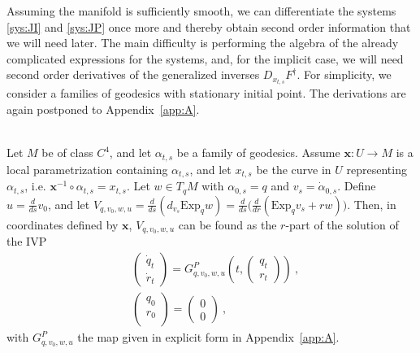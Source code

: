 \documentclass[final]{svjour3}
\newcommand{\df}[2]{\tfrac{d}{d#2} #1}
\newcommand{\Exp}{\mathrm{Exp}}
\newcommand{\param}[1]{\mathbf{#1}}
\begin{document}
Assuming the manifold is sufficiently smooth, we can differentiate the systems 
\eqref{sys:JI} and \eqref{sys:JP} once more and thereby obtain second order
information that we will need later. The main difficulty is
performing the algebra of the already complicated expressions for the systems,
and, for the implicit case, we will need second
order derivatives of the generalized inverses $D_{x_{t,s}}F^\dagger$.
For simplicity, we consider a families of geodesics with stationary initial
point. The derivations are
again postponed to Appendix~\ref{app:A}.
\begin{em}
  \vspace{0.5em}
  \\
    Let $M$ be of class $C^4$, and let $\alpha_{t,s}$ be a family of 
    geodesics. Assume $\param{x}:U\rightarrow M$ is a local parametrization
    containing $\alpha_{t,s}$, and let $x_{t,s}$
    be the curve in $U$ representing $\alpha_{t,s}$, i.e.
    $\param{x}^{-1}\circ\alpha_{t,s}=x_{t,s}$. Let $w\in T_qM$ with $\alpha_{0,s}=q$
    and $v_s=\dot{\alpha}_{0,s}$. Define $u=\df{v_0}{s}$, and let
    $V_{q,v_0,w,u}=\df{\left(d_{v_s}\Exp_qw\right)}{s}
    =\df{\Big(\df{\left(\Exp_qv_s+rw\right)}{r}\Big)}{s}$.
    Then, in coordinates defined by $\param{x}$, $V_{q,v_0,w,u}$ can be found as the 
    $r$-part of the solution of the IVP
    \begin{equation}
        \begin{split}
            &
            \begin{pmatrix}
                \dot{q}_t\\
                \dot{r}_t
            \end{pmatrix}
            =
            G_{q,v_0,w,u}^P\left(t,
            \begin{pmatrix}
                q_t\\
                r_t
            \end{pmatrix}
            \right)
            \ ,\\
            &
            \begin{pmatrix}
                q_0\\
                r_0\\
            \end{pmatrix}
            =
            \begin{pmatrix}
                0\\
                0
            \end{pmatrix}
            \ ,
        \end{split}
        \label{sys:JP2}
    \end{equation}
    with $G_{q,v_0,w,u}^P$ the map given in explicit form in Appendix~\ref{app:A}.


\end{em}
\end{document}
